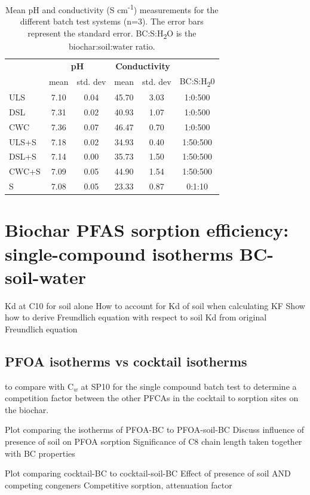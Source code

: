 \begin{table}
\centering
\caption{Mean pH and conductivity (\textmu S cm\textsuperscript{-1}) measurements for the different batch test systems (n=3). The error bars represent the standard error. BC:S:H\textsubscript{2}O is the biochar:soil:water ratio.}
\label{tab:pHcond}
\begin{tabular}{lccccc}
\toprule
 & \multicolumn{2}{c}{\textbf{pH}} & \multicolumn{2}{c}{\textbf{Conductivity}} & \\ \cline{2-5}
 & mean & std. dev & mean & std. dev & BC:S:H\textsubscript{2}0\\ 
\midrule
ULS & 7.10 & 0.04 & 45.70 & 3.03 & 1:0:500\\
DSL & 7.31 & 0.02 & 40.93 & 1.07 & 1:0:500\\
CWC & 7.36 & 0.07 & 46.47 & 0.70 & 1:0:500\\
ULS+S & 7.18 & 0.02 & 34.93 & 0.40 & 1:50:500\\
DSL+S & 7.14 & 0.00 & 35.73 & 1.50 & 1:50:500\\
CWC+S & 7.09 & 0.05 & 44.90 & 1.54 & 1:50:500\\
S & 7.08 & 0.05 & 23.33 & 0.87 & 0:1:10\\
\bottomrule
\end{tabular}
\end{table}


\section{Biochar PFAS sorption efficiency: single-compound isotherms BC-soil-water}
Kd at C10 for soil alone
How to account for Kd of soil when calculating KF 
    Show how to derive Freundlich equation with respect to soil Kd from original Freundlich equation
    
\subsection{PFOA isotherms vs cocktail isotherms}
to compare with C$_w$ at SP10 for the single compound batch test to determine a competition factor between the other PFCAs in the cocktail to sorption sites on the biochar.

Plot comparing the isotherms of PFOA-BC to PFOA-soil-BC
Discuss influence of presence of soil on PFOA sorption
Significance of C8 chain length taken together with BC properties 

Plot comparing cocktail-BC to cocktail-soil-BC
Effect of presence of soil AND competing congeners
Competitive sorption, attenuation factor

